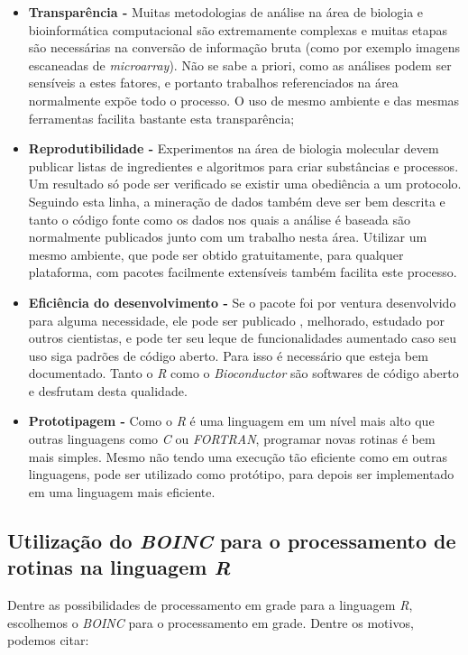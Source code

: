 \begin{itemize}
  \item \textbf{Transparência -} Muitas metodologias de análise na área de biologia e bioinformática computacional
são extremamente complexas e muitas etapas são necessárias na conversão de informação bruta (como por exemplo imagens 
escaneadas de \emph{microarray}). Não se sabe a priori, como as análises podem ser sensíveis a estes fatores, e portanto
trabalhos referenciados na área normalmente expõe todo o processo. O uso de mesmo ambiente e das mesmas ferramentas 
facilita bastante esta transparência;
  \item \textbf{Reprodutibilidade -} Experimentos na área de biologia molecular devem publicar listas de ingredientes
e algoritmos para criar substâncias e processos. Um resultado só pode ser verificado se existir uma obediência a 
um protocolo. Seguindo esta linha, a mineração de dados também deve ser bem descrita e tanto o código fonte 
como os dados nos quais a análise é baseada são normalmente publicados junto com um trabalho nesta área. Utilizar
um mesmo ambiente, que pode ser obtido gratuitamente, para qualquer plataforma, com pacotes 
facilmente extensíveis também facilita este processo.
  \item \textbf{Eficiência do desenvolvimento -} Se o pacote foi por ventura desenvolvido para alguma necessidade, ele pode ser publicado
, melhorado, estudado por outros cientistas, e pode ter seu leque de funcionalidades aumentado caso seu uso siga padrões
de código aberto. Para isso é necessário que esteja bem documentado. Tanto o \emph{R} como o \emph{Bioconductor} são softwares
de código aberto e desfrutam desta qualidade.
  \item \textbf{Prototipagem -} Como o \emph{R} é uma linguagem em um nível mais alto que outras linguagens como \emph{C} ou
\emph{FORTRAN}, programar novas rotinas é bem mais simples. Mesmo não tendo uma execução tão eficiente como em outras
linguagens, pode ser utilizado como protótipo, para depois ser implementado em uma linguagem mais eficiente. 

\end{itemize}

\subsection{Utilização do \emph{BOINC} para o processamento de rotinas na linguagem \emph{R}}

Dentre as possibilidades de processamento em grade para a linguagem \emph{R}, escolhemos o \emph{BOINC} para o processamento em grade.
Dentre os motivos, podemos citar:

